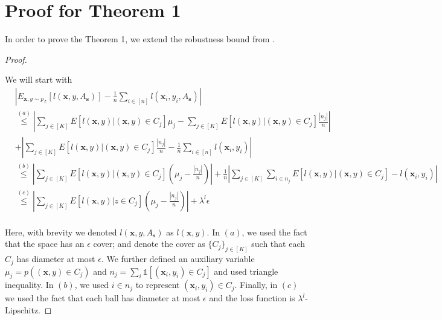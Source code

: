 \section{Proof for Theorem 1}
In order to prove the Theorem 1, we extend the robustness bound from \cite{robust}.
\begin{proof}
\begin{small}
We will start with
\[
\begin{aligned}
&\left|E_{\mathbf{x},y \sim p_\mathcal{Z}}[l(\mathbf{x},y, A_\mathbf{s})] - \frac{1}{n}\sum_{i \in [n]} l(\mathbf{x}_i,y_i,A_\mathbf{s})\right| \\
&\overset{(a)}{\leq} \left|\sum_{j \in [K]} E[l(\mathbf{x},y)| (\mathbf{x},y) \in C_j] \mu_{j} -  \sum_{j \in [K]} E[l(\mathbf{x},y)| (\mathbf{x},y) \in C_j] \frac{|n_j|}{n} \right| \\
 &+  \left| \sum_{j \in [K]} E[l(\mathbf{x},y)| (\mathbf{x},y) \in C_j] \frac{|n_j|}{n}  - \frac{1}{n}\sum_{i \in [n]} l(\mathbf{x}_i,y_i) \right| \\
  &\overset{(b)}{\leq}\left|\sum_{j \in [K]} E[l(\mathbf{x},y)| (\mathbf{x},y) \in C_j] (\mu_{j} -   \frac{|n_j|}{n}) \right|
 +\frac{1}{n} \left|\sum_{j \in [K]} \sum_{i \in n_j} E[l(\mathbf{x},y)| (\mathbf{x},y) \in C_j]  - l(\mathbf{x}_i,y_i)\right| \\
   &\overset{(c)}{\leq} \left|\sum_{j \in [K]} E[l(\mathbf{x},y)|z \in C_j] (\mu_{j} -   \frac{|n_j|}{n})\right| + \lambda^l \epsilon  \\
 \end{aligned}
\]
\end{small}

Here, with brevity we denoted $l(\mathbf{x},y, A_\mathbf{s})$ as $l(\mathbf{x},y)$. In $(a)$, we used the fact that the space has an $\epsilon$ cover; and denote the cover as $\{C_j\}_{j \in [K]}$ such that each $C_j$ has diameter at most $\epsilon$. We further defined an auxiliary variable $\mu_j=p((\mathbf{x},y) \in C_j)$ and $n_j = \sum_i \mathds{1}[(\mathbf{x}_i,y_i) \in C_j]$ and used triangle inequality. In $(b)$, we used $i \in n_j$ to represent $(\mathbf{x}_i,y_i) \in C_j$. Finally, in $(c)$ we used the fact that each ball has diameter at most $\epsilon$ and the loss function is $\lambda^l$-Lipschitz. 


\end{proof}
